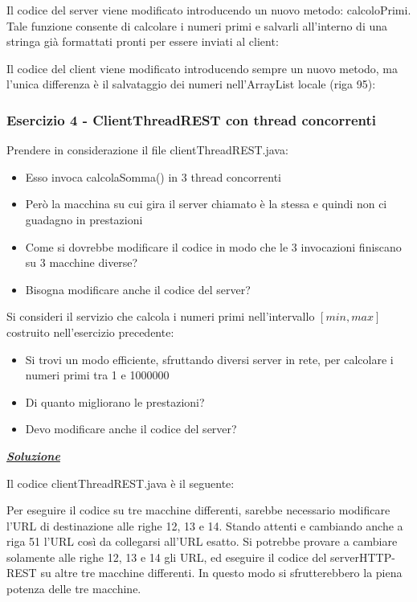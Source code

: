 \documentclass[a4paper]{article}
\begin{document}
	\noindent
	Il codice del server viene modificato introducendo un nuovo metodo: \textsf{calcoloPrimi}. Tale funzione consente di calcolare i numeri primi e salvarli all'interno di una stringa già formattati pronti per essere inviati al client:
	\newpage
	
	\noindent
	Il codice del client viene modificato introducendo sempre un nuovo metodo, ma l'unica differenza è il salvataggio dei numeri nell'\textsf{ArrayList} locale (riga 95):
	\newpage
	
	\subsubsection{Esercizio 4 - \textsf{ClientThreadREST} con thread concorrenti}
	
	Prendere in considerazione il file \textsf{clientThreadREST.java}:
	\begin{itemize}
		\item Esso invoca \textsf{calcolaSomma()} in 3 thread concorrenti
		
		\item Però la macchina su cui gira il server chiamato è la stessa e quindi non ci guadagno in prestazioni
		
		\item Come si dovrebbe modificare il codice in modo che le 3 invocazioni finiscano su 3 macchine diverse?
		
		\item Bisogna modificare anche il codice del server?
	\end{itemize}
	Si consideri il servizio che calcola i numeri primi nell'intervallo $\left[min, max\right]$ costruito nell'esercizio precedente:
	\begin{itemize}
		\item Si trovi un modo efficiente, sfruttando diversi server in rete, per calcolare i numeri primi tra 1 e 1000000
		
		\item Di quanto migliorano le prestazioni?
		
		\item Devo modificare anche il codice del server?
	\end{itemize}
	
	\noindent
	\textcolor{Green4}{\underline{\textbf{\emph{Soluzione}}}}\newline
	
	\noindent
	Il codice \textsf{clientThreadREST.java} è il seguente:
	
	Per eseguire il codice su tre macchine differenti, sarebbe necessario modificare l'URL di destinazione alle righe 12, 13 e 14. Stando attenti e cambiando anche a riga 51 l'URL così da collegarsi all'URL esatto. Si potrebbe provare a cambiare solamente alle righe 12, 13 e 14 gli URL, ed eseguire il codice del serverHTTP-REST su altre tre macchine differenti. In questo modo si sfrutterebbero la piena potenza delle tre macchine.\newpage
\end{document}
